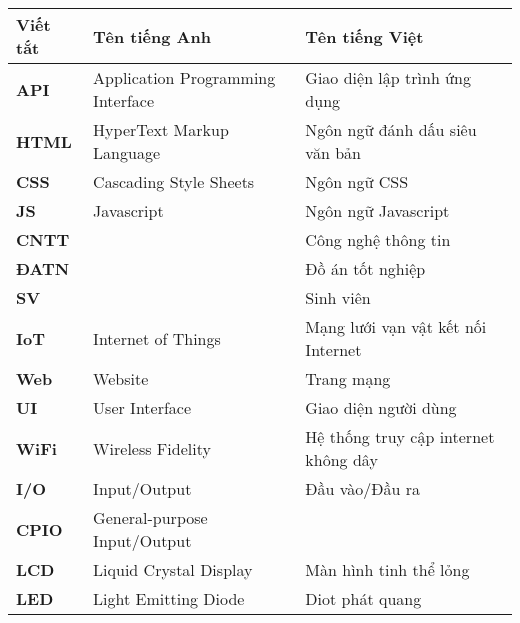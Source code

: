\documentclass[../DoAn.tex]{subfiles}
\begin{document}
\begin{longtable}{l p{6cm} p{7cm}}
	\hline
   \textbf{Viết tắt}  & \textbf{Tên tiếng Anh}	& \textbf{Tên tiếng Việt} \\ \hline 
	\textbf{API} & Application Programming Interface & Giao diện lập trình ứng dụng\\
	\textbf{HTML} & HyperText Markup Language & Ngôn ngữ đánh dấu siêu văn bản\\
    \textbf{CSS} & Cascading Style Sheets & Ngôn ngữ CSS\\
    \textbf{JS} & Javascript & Ngôn ngữ Javascript\\
	\textbf{CNTT }  &   & Công nghệ thông tin\\
	\textbf{ĐATN} &  & Đồ án tốt nghiệp \\
	\textbf{SV} &  & Sinh viên \\
    \textbf{IoT} & Internet of Things & Mạng lưới vạn vật kết nối Internet \\
    \textbf{Web} & Website & Trang mạng \\
    \textbf{UI} & User Interface & Giao diện người dùng \\
    \textbf{WiFi} & Wireless Fidelity & Hệ thống truy cập internet không dây \\
    \textbf{I/O} & Input/Output & Đầu vào/Đầu ra \\
    \textbf{CPIO} & General-purpose Input/Output &  \\
    \textbf{LCD} & Liquid Crystal Display & Màn hình tinh thể lỏng \\
    \textbf{LED} & Light Emitting Diode & Diot phát quang \\
    \hline
\end{longtable}
\end{document}

